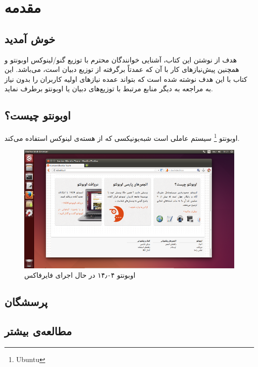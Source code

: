 \chapter{مقدمه}
\section{خوش آمدید}
هدف از نوشتن این کتاب، آشنایی خوانندگان محترم با توزیع گنو/لینوکس اوبونتو و همچنین پیش‌نیازهای کار با آن که عمدتاً برگرفته از توزیع دبیان است، می‌باشد. این کتاب با این هدف نوشته شده است که بتواند عمده نیازهای اولیه کاربران را بدون نیاز به مراجعه به دیگر منابع مرتبط با توزیع‌‌های دبیان یا اوبونتو برطرف نماید.
\section{اوبونتو چیست؟}
اوبونتو
\footnote{Ubuntu}
سیستم عاملی است شبه‌یونیکسی که از هسته‌ی لینوکس استفاده می‌کند.
\begin{figure}[hbtp]
\centering
\includegraphics[scale=0.5]{pics/ubuntu-14.04-firefox.png}
\caption{اوبونتو ۱۴٫۰۴ در حال اجرای فایرفاکس}
\label{fig:ubuntu-14.04-firefox}
\end{figure}

\section{پرسشگان}
\section{مطالعه‌ی بیشتر}
